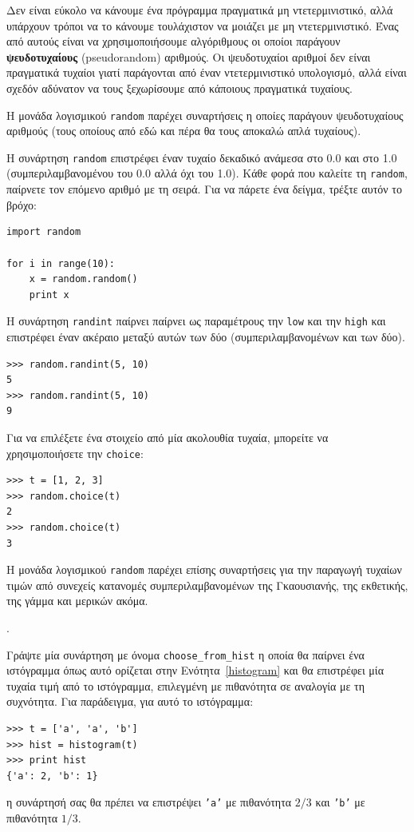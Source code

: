 \documentclass[10pt]{book}
\begin{document}
Δεν είναι εύκολο να κάνουμε ένα πρόγραμμα πραγματικά μη ντετερμινιστικό, αλλά υπάρχουν τρόποι να το κάνουμε τουλάχιστον να μοιάζει με μη ντετερμινιστικό. Ένας από αυτούς είναι να χρησιμοποιήσουμε αλγόριθμους οι οποίοι παράγουν {\bf ψευδοτυχαίους} (pseudorandom) αριθμούς. Οι ψευδοτυχαίοι αριθμοί δεν είναι πραγματικά τυχαίοι γιατί παράγονται από έναν ντετερμινιστικό υπολογισμό, αλλά είναι σχεδόν αδύνατον να τους ξεχωρίσουμε από κάποιους πραγματικά τυχαίους.

Η μονάδα λογισμικού {\tt random} παρέχει συναρτήσεις η οποίες παράγουν ψευδοτυχαίους αριθμούς (τους οποίους από εδώ και πέρα θα τους αποκαλώ απλά τυχαίους).

Η συνάρτηση {\tt random} επιστρέφει έναν τυχαίο δεκαδικό ανάμεσα στο 0.0 και στο 1.0 (συμπεριλαμβανομένου του 0.0 αλλά όχι του 1.0). Κάθε φορά που καλείτε τη {\tt random}, παίρνετε τον επόμενο αριθμό με τη σειρά. Για να πάρετε ένα δείγμα, τρέξτε αυτόν το βρόχο:

\begin{verbatim}
import random

for i in range(10):
    x = random.random()
    print x
\end{verbatim}
%
Η συνάρτηση {\tt randint} παίρνει παίρνει ως παραμέτρους την {\tt low} και την {\tt high} και επιστρέφει έναν ακέραιο μεταξύ αυτών των δύο (συμπεριλαμβανομένων και των δύο).

\begin{verbatim}
>>> random.randint(5, 10)
5
>>> random.randint(5, 10)
9
\end{verbatim}
%
Για να επιλέξετε ένα στοιχείο από μία ακολουθία τυχαία, μπορείτε να χρησιμοποιήσετε την {\tt choice}:

\begin{verbatim}
>>> t = [1, 2, 3]
>>> random.choice(t)
2
>>> random.choice(t)
3
\end{verbatim}
%
Η μονάδα λογισμικού {\tt random} παρέχει επίσης συναρτήσεις για την παραγωγή τυχαίων τιμών από συνεχείς κατανομές συμπεριλαμβανομένων της Γκαουσιανής, της εκθετικής, της γάμμα και μερικών ακόμα.
\\
\begin{exercise}.

Γράψτε μία συνάρτηση με όνομα \verb"choose_from_hist" η οποία θα παίρνει ένα ιστόγραμμα όπως αυτό ορίζεται στην Ενότητα~\ref{histogram} και θα επιστρέφει μία τυχαία τιμή από το ιστόγραμμα, επιλεγμένη με πιθανότητα σε αναλογία με τη συχνότητα. Για παράδειγμα, για αυτό το ιστόγραμμα:

\begin{verbatim}
>>> t = ['a', 'a', 'b']
>>> hist = histogram(t)
>>> print hist
{'a': 2, 'b': 1}
\end{verbatim}
%
η συνάρτησή σας θα πρέπει να επιστρέψει {\tt 'a'} με πιθανότητα $2/3$ και {\tt 'b'} με πιθανότητα $1/3$.
\end{exercise}
\end{document}
